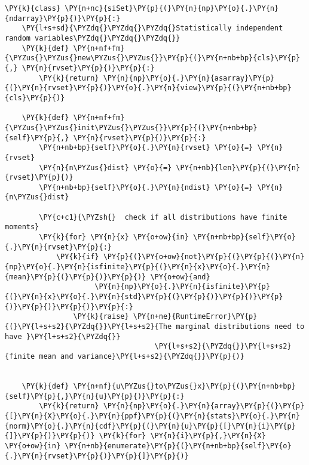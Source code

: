     \begin{tcolorbox}[breakable, size=fbox, boxrule=1pt, pad at break*=1mm,colback=cellbackground, colframe=cellborder]
\begin{Verbatim}[commandchars=\\\{\}]
\PY{k}{class} \PY{n+nc}{siSet}\PY{p}{(}\PY{n}{np}\PY{o}{.}\PY{n}{ndarray}\PY{p}{)}\PY{p}{:}
    \PY{l+s+sd}{\PYZdq{}\PYZdq{}\PYZdq{}Statistically independent random variables\PYZdq{}\PYZdq{}\PYZdq{}}
    \PY{k}{def} \PY{n+nf+fm}{\PYZus{}\PYZus{}new\PYZus{}\PYZus{}}\PY{p}{(}\PY{n+nb+bp}{cls}\PY{p}{,} \PY{n}{rvset}\PY{p}{)}\PY{p}{:}
        \PY{k}{return} \PY{n}{np}\PY{o}{.}\PY{n}{asarray}\PY{p}{(}\PY{n}{rvset}\PY{p}{)}\PY{o}{.}\PY{n}{view}\PY{p}{(}\PY{n+nb+bp}{cls}\PY{p}{)}

    \PY{k}{def} \PY{n+nf+fm}{\PYZus{}\PYZus{}init\PYZus{}\PYZus{}}\PY{p}{(}\PY{n+nb+bp}{self}\PY{p}{,} \PY{n}{rvset}\PY{p}{)}\PY{p}{:}
        \PY{n+nb+bp}{self}\PY{o}{.}\PY{n}{rvset} \PY{o}{=} \PY{n}{rvset}
        \PY{n}{n\PYZus{}dist} \PY{o}{=} \PY{n+nb}{len}\PY{p}{(}\PY{n}{rvset}\PY{p}{)}
        \PY{n+nb+bp}{self}\PY{o}{.}\PY{n}{ndist} \PY{o}{=} \PY{n}{n\PYZus{}dist}

        \PY{c+c1}{\PYZsh{}  check if all distributions have finite moments}
        \PY{k}{for} \PY{n}{x} \PY{o+ow}{in} \PY{n+nb+bp}{self}\PY{o}{.}\PY{n}{rvset}\PY{p}{:}
            \PY{k}{if} \PY{p}{(}\PY{o+ow}{not}\PY{p}{(}\PY{p}{(}\PY{n}{np}\PY{o}{.}\PY{n}{isfinite}\PY{p}{(}\PY{n}{x}\PY{o}{.}\PY{n}{mean}\PY{p}{(}\PY{p}{)}\PY{p}{)} \PY{o+ow}{and}
                     \PY{n}{np}\PY{o}{.}\PY{n}{isfinite}\PY{p}{(}\PY{n}{x}\PY{o}{.}\PY{n}{std}\PY{p}{(}\PY{p}{)}\PY{p}{)}\PY{p}{)}\PY{p}{)}\PY{p}{)}\PY{p}{:}
                \PY{k}{raise} \PY{n+ne}{RuntimeError}\PY{p}{(}\PY{l+s+s2}{\PYZdq{}}\PY{l+s+s2}{The marginal distributions need to have }\PY{l+s+s2}{\PYZdq{}}
                                   \PY{l+s+s2}{\PYZdq{}}\PY{l+s+s2}{finite mean and variance}\PY{l+s+s2}{\PYZdq{}}\PY{p}{)}


    \PY{k}{def} \PY{n+nf}{u\PYZus{}to\PYZus{}x}\PY{p}{(}\PY{n+nb+bp}{self}\PY{p}{,}\PY{n}{u}\PY{p}{)}\PY{p}{:}
        \PY{k}{return} \PY{n}{np}\PY{o}{.}\PY{n}{array}\PY{p}{(}\PY{p}{[}\PY{n}{X}\PY{o}{.}\PY{n}{ppf}\PY{p}{(}\PY{n}{stats}\PY{o}{.}\PY{n}{norm}\PY{o}{.}\PY{n}{cdf}\PY{p}{(}\PY{n}{u}\PY{p}{[}\PY{n}{i}\PY{p}{]}\PY{p}{)}\PY{p}{)} \PY{k}{for} \PY{n}{i}\PY{p}{,}\PY{n}{X} \PY{o+ow}{in} \PY{n+nb}{enumerate}\PY{p}{(}\PY{n+nb+bp}{self}\PY{o}{.}\PY{n}{rvset}\PY{p}{)}\PY{p}{]}\PY{p}{)}
    

\end{Verbatim}
\end{tcolorbox}
